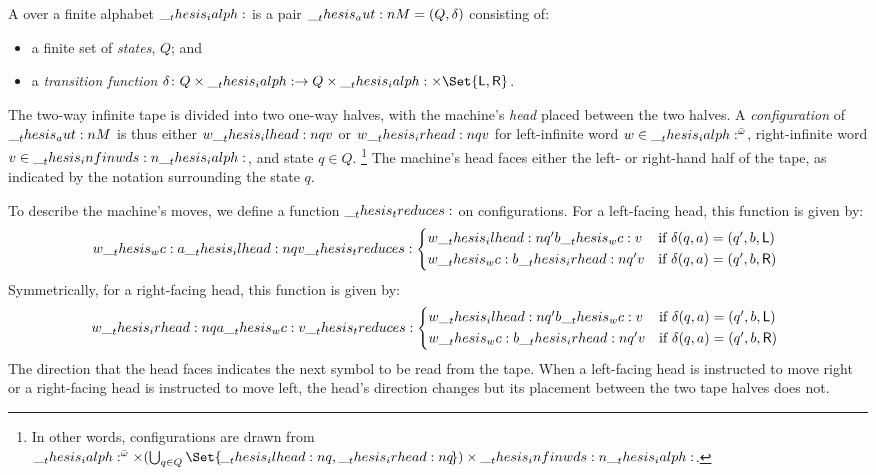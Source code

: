 \begin{definition}
  A  over a finite alphabet $\__thesis_ialph:$ is a pair $\__thesis_aut:n {M} = (Q, \delta)$ consisting of:
  \begin{itemize}
  \item a finite set of \emph{states}, $Q$; and
  \item a \emph{transition function} $\delta\colon Q \times \ialph \to Q \times \ialph \times \Set{\mathsf{L}, \mathsf{R}}$.
  \end{itemize}
  The two-way infinite tape is divided into two one-way halves, with the machine's \emph{head} placed between the two halves.
  A \emph{configuration} of $\__thesis_aut:n {M}$ is thus either $w \__thesis_ilhead:n {q} v$ or $w \__thesis_irhead:n {q} v$ for left-infinite word $w \in \__thesis_ialph:^{\bar{\omega}}$, right-infinite word $v \in \__thesis_infinwds:n {\__thesis_ialph:}$, and state $q \in Q$.%
  \footnote{In other words, configurations are drawn from $\ialph^{\bar{\omega}} \times (\bigcup_{q \in Q} \Set{\!{} \itlhead{q} {}, {} \itrhead{q} {}\!}) \times \infinwds{\ialph}$.}
  The machine's head faces either the left- or right-hand half of the tape, as indicated by the notation surrounding the state $q$.

  To describe the machine's moves, we define a function $\__thesis_treduces:$ on configurations.
  For a left-facing head, this function is given by:
  \begin{equation*}
      w \wc a \itlhead{q} v \treduces
        \begin{cases*}
          w \itlhead{q'} b \wc v & if $\delta(q, a) = (q', b, \mathsf{L})$ \\
          w \wc b \itrhead{q'} v & if $\delta(q, a) = (q', b, \mathsf{R})$
        \end{cases*}
  \end{equation*}
  Symmetrically, for a right-facing head, this function is given by:
  \begin{equation*}
      w \itrhead{q} a \wc v \treduces
        \begin{cases*}
          w \itlhead{q'} b \wc v & if $\delta(q, a) = (q', b, \mathsf{L})$ \\
          w \wc b \itrhead{q'} v & if $\delta(q, a) = (q', b, \mathsf{R})$
        \end{cases*}
  \end{equation*}
  The direction that the head faces indicates the next symbol to be read from the tape.
  When a left-facing head is instructed to move right or a right-facing head is instructed to move left, the head's direction changes but its placement between the two tape halves does not.
\end{definition}



